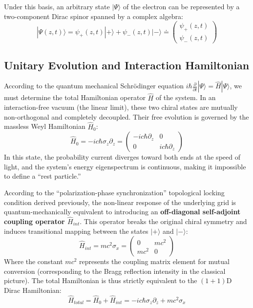 \documentclass[12pt, a4paper]{article}
\begin{document}
Under this basis, an arbitrary state $|\Psi\rangle$ of the electron can be represented by a two-component Dirac spinor spanned by a complex algebra:
\begin{equation}
    |\Psi(z, t)\rangle = \psi_+(z, t)|+\rangle + \psi_-(z, t)|-\rangle \doteq \begin{pmatrix} \psi_+(z, t) \\ \psi_-(z, t) \end{pmatrix}
\end{equation}

\subsection{Unitary Evolution and Interaction Hamiltonian}

According to the quantum mechanical Schr\"{o}dinger equation $i\hbar \frac{\partial}{\partial t}|\Psi\rangle = \hat{H}|\Psi\rangle$, we must determine the total Hamiltonian operator $\hat{H}$ of the system. 
In an interaction-free vacuum (the linear limit), these two chiral states are mutually non-orthogonal and completely decoupled. Their free evolution is governed by the massless Weyl Hamiltonian $\hat{H}_0$:
\begin{equation}
    \hat{H}_0 = -ic\hbar \sigma_z \partial_z = \begin{pmatrix} -ic\hbar\partial_z & 0 \\ 0 & ic\hbar\partial_z \end{pmatrix}
\end{equation}
In this state, the probability current diverges toward both ends at the speed of light, and the system's energy eigenspectrum is continuous, making it impossible to define a ``rest particle.''

According to the ``polarization-phase synchronization'' topological locking condition derived previously, the non-linear response of the underlying grid is quantum-mechanically equivalent to introducing an \textbf{off-diagonal self-adjoint coupling operator $\hat{H}_{int}$}. This operator breaks the original chiral symmetry and induces transitional mapping between the states $|+\rangle$ and $|-\rangle$:
\begin{equation}
    \hat{H}_{int} = mc^2 \sigma_x = \begin{pmatrix} 0 & mc^2 \\ mc^2 & 0 \end{pmatrix}
\end{equation}
Where the constant $mc^2$ represents the coupling matrix element for mutual conversion (corresponding to the Bragg reflection intensity in the classical picture). The total Hamiltonian is thus strictly equivalent to the $(1+1)$D Dirac Hamiltonian:
\begin{equation}
    \hat{H}_{total} = \hat{H}_0 + \hat{H}_{int} = -ic\hbar\sigma_z \partial_z + mc^2\sigma_x
\end{equation}
\end{document}
